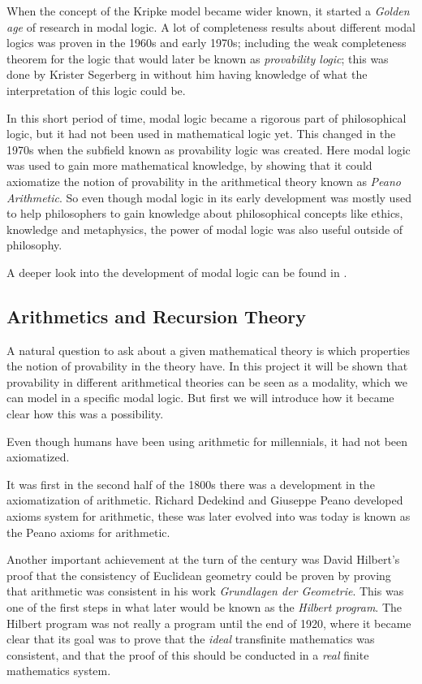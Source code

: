 \documentclass[../main.tex]{subfiles}
\begin{document}
When the concept of the Kripke model became wider known, it started a
\textit{Golden age} of research in modal logic. A lot of completeness results
about different modal logics was proven in the 1960s and early 1970s; including
the weak completeness theorem for the logic that would later be known as
\textit{provability logic}; this was done by Krister Segerberg in
\parencite{Sgerberg1971} without him having
knowledge of what the interpretation of this logic could be.

In this short period of time, modal logic became a rigorous part of
philosophical logic, but it had not been used in mathematical logic yet. This
changed in the 1970s when the subfield known as provability logic was created.
Here modal logic was used to gain more mathematical knowledge, by showing that
it could axiomatize the notion of provability in the arithmetical theory known
as \textit{Peano Arithmetic}. So even though modal logic in its early development was
mostly used to help philosophers to gain knowledge about philosophical concepts
like ethics, knowledge and metaphysics, the power of modal logic was also
useful outside of philosophy.

A deeper look into the development of modal logic can be found in
\parencite{Goldblatt2003}.
\subsection{Arithmetics and Recursion Theory}
A natural question to ask about a given mathematical theory is which properties
the notion of provability in the theory have. In this project it will be shown
that provability in different arithmetical theories  can be seen as a modality,
which we can model in a specific
modal logic. But first we will introduce how it became clear how this was a
possibility.

Even though humans have been using arithmetic for millennials, it had not been
axiomatized.

It was first in  the second half of the 1800s there was a development in the axiomatization
of arithmetic. Richard Dedekind and Giuseppe Peano developed axioms system for arithmetic,
these was later evolved into was today is known as the Peano axioms for
arithmetic. 

Another important achievement at the turn of the century was David Hilbert's
proof that the consistency of Euclidean geometry could be proven by proving
that arithmetic was consistent in his work  \textit{Grundlagen der Geometrie}.
This was one of the first steps in what later
would be known as the \textit{Hilbert program}. 
The Hilbert program was not really a program until the end of 1920, where it
became clear that its goal was to prove that the \textit{ideal} transfinite mathematics was
consistent, and that the proof of this should be conducted in a \textit{real}
finite mathematics system.
\end{document}
